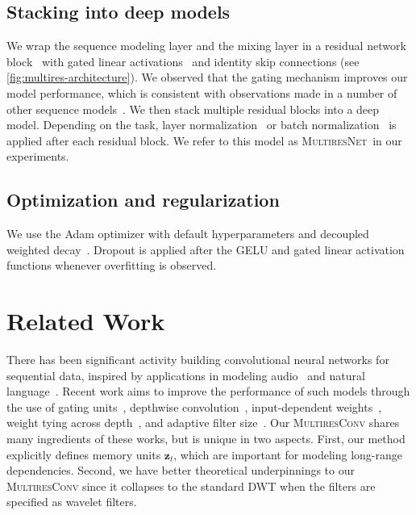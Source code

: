 \documentclass{article}
\theoremstyle{plain}
\theoremstyle{definition}
\theoremstyle{remark}
\newcommand{\ourmodel}{\textsc{MultiresNet}}
\begin{document}
\subsection{Stacking into deep models}

We wrap the sequence modeling layer and the mixing layer in a residual network block~\citep{he2016deep} with gated linear activations~\citep{dauphin2017language} and identity skip connections (see \cref{fig:multires-architecture}). 
We observed that the gating mechanism improves our model performance, which is consistent with observations made in a number of other sequence models~\citep{dauphin2017language, van2016conditional, oord2016wavenet, gu2021efficiently}. 
We then stack multiple residual blocks into a deep model. 
Depending on the task, layer normalization~\citep{ba2016layer} or batch normalization~\citep{ioffe2015batch} is applied after each residual block. 
We refer to this model as \ourmodel\ in our experiments. 


\subsection{Optimization and regularization} 
We use the Adam optimizer with default hyperparameters and decoupled weighted decay~\citep{loshchilov2018decoupled}. 
Dropout is applied after the GELU and gated linear activation functions whenever overfitting is observed.












\section{Related Work}
\label{sec:related-work}

There has been significant activity building convolutional neural networks for sequential data, inspired by applications in modeling audio~\citep{waibel1989phoneme,oord2016wavenet} and natural language~\citep{collobert2011natural,kalchbrenner2016neural}. 
Recent work aims to improve the performance of such models through the use of gating units~\citep{dauphin2017language}, depthwise convolution~\citep{kaiserdepthwise}, input-dependent weights~\citep{shen2018learning,wu2018pay}, weight tying across depth~\citep{bai2019trellis}, and adaptive filter size~\cite{romero2022flexconv}. 
Our \textsc{MultiresConv} shares many ingredients of these works, but is unique in two aspects. 
First, our method explicitly defines memory units $\mathbf z_t$,  which are important for modeling long-range dependencies. 
Second, we have better theoretical underpinnings to our \textsc{MultiresConv} since it collapses to the standard DWT when the filters are specified as wavelet filters.
\end{document}
